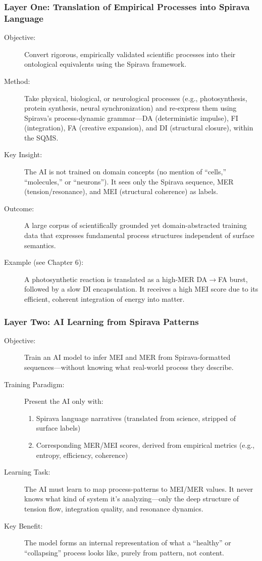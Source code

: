 \documentclass[11pt, a4paper]{article}
\begin{document}
\hrulefill

\subsubsection*{Layer One: Translation of Empirical Processes into Spirava Language}
\begin{description}
    \item[Objective:] Convert rigorous, empirically validated scientific processes into their ontological equivalents using the Spirava framework.
    \item[Method:] Take physical, biological, or neurological processes (e.g., photosynthesis, protein synthesis, neural synchronization) and re-express them using Spirava’s process-dynamic grammar—DA (deterministic impulse), FI (integration), FA (creative expansion), and DI (structural closure), within the SQMS.
    \item[Key Insight:] The AI is not trained on domain concepts (no mention of “cells,” “molecules,” or “neurons”). It sees only the Spirava sequence, MER (tension/resonance), and MEI (structural coherence) as labels.
    \item[Outcome:] A large corpus of scientifically grounded yet domain-abstracted training data that expresses fundamental process structures independent of surface semantics.
    \item[Example (see Chapter 6):] A photosynthetic reaction is translated as a high-MER DA$\rightarrow$FA burst, followed by a slow DI encapsulation. It receives a high MEI score due to its efficient, coherent integration of energy into matter.
\end{description}

\hrulefill

\subsubsection*{Layer Two: AI Learning from Spirava Patterns}
\begin{description}
    \item[Objective:] Train an AI model to infer MEI and MER from Spirava-formatted sequences—without knowing what real-world process they describe.
    \item[Training Paradigm:] Present the AI only with:
    \begin{enumerate}
        \item Spirava language narratives (translated from science, stripped of surface labels)
        \item Corresponding MER/MEI scores, derived from empirical metrics (e.g., entropy, efficiency, coherence)
    \end{enumerate}
    \item[Learning Task:] The AI must learn to map process-patterns to MEI/MER values. It never knows what kind of system it's analyzing—only the deep structure of tension flow, integration quality, and resonance dynamics.
    \item[Key Benefit:] The model forms an internal representation of what a “healthy” or “collapsing” process looks like, purely from pattern, not content.
\end{description}
\end{document}
